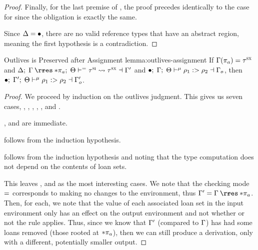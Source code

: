 \begin{proof}
  Finally, for the last premise of , the proof precedes
  identically to the case for  since the obligation is
  exactly the same.

  \vspace{1em}
  \noindent \framebox[\textwidth]{ \figuresize
    \begin{mathpar}
      \ODerefAbs
    \end{mathpar}
  } \vspace{1em}

  Since $\Delta = \bullet$, there are no valid reference types that have
  an abstract region, meaning the first hypothesis is a contradiction.
\end{proof}

\begin{oxlemma}{Outlives is Preserved after Assignment}
  {lemma:outlives-assignment} If
  $\Gamma(\pi_a) = \tau^\textsc{sx}$
  and $\oxtunify[\oxnoop]{\oxtvarctx}{\oxkontctx}{
    \oxrsub{\oxvarctx}{\oxderef{\oxplace_a}}
  }{\oxsitype}{\oxsxtype}{\oxvarctx^\prime}$ and
  $\bullet; \; \Gamma; \; \Theta \vdash^{\mu} \rho_1 :> \rho_2 \dashv \Gamma_o$, then
  $\bullet; \; \Gamma^\prime; \; \Theta \vdash^{\mu} \rho_1 :> \rho_2 \dashv 
    \Gamma^\prime_o
 $.
\end{oxlemma}

\begin{proof}
  We proceed by induction on the outlives judgment. This gives us seven cases,
  , , ,
  , ,
   and .

  ,  and 
  are immediate.

   follows from the induction hypothesis.

   follows from the induction hypothesis and
  noting that the type computation does not depend on the contents of loan sets.

  This leaves ,
   and  as the most
  interesting cases. We note that the checking mode $=$ corresponds to
  making no changes to the environment, thus $\oxvarctx^\prime =
  \oxrsub{\oxvarctx}{\oxderef{\oxplace_a}}$. Then, for each, we note that the
  value of each associated loan set in the input environment only has an effect
  on the output environment and not whether or not the rule applies. Thus, since
  we know that $\Gamma^\prime$ (compared to $\Gamma$) has had some loans
  removed (those rooted at $* \pi_a$), then we can still produce a
  derivation, only with a different, potentially smaller output.
\end{proof}

